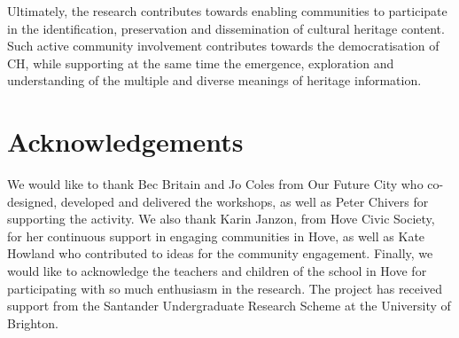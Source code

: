 \documentclass[acmlarge,screen,dvipsnames]{acmart}
\begin{document}


Ultimately, the research contributes towards enabling communities to
participate in the identification, preservation and dissemination of cultural heritage content. Such active community involvement contributes towards the democratisation of CH, while supporting at the same time the emergence, exploration and understanding of the multiple and diverse meanings of heritage information.


\section{Acknowledgements} We would like to thank Bec Britain and Jo Coles
from Our Future City who co-designed, developed and delivered the workshops, as
well as Peter Chivers for supporting the activity. We also thank Karin Janzon,
from Hove Civic Society, for her continuous support in engaging communities in
Hove, as well as Kate Howland who contributed to ideas for the community engagement. 
Finally, we would like to acknowledge the teachers and children of the
school in Hove for participating with so much enthusiasm in the research. 
The project has received support from the Santander Undergraduate Research Scheme
at the University of Brighton.




%

 

\end{document}
